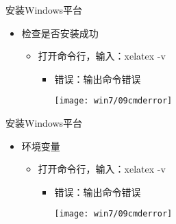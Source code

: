 \documentclass[fontset = none, t]{ctexbeamer}
\begin{document}
\begin{frame}{安装\tl}{Windows平台}
  \begin{spacing}{1.5}
    \begin{itemize}
    \item 检查\tl 是否安装成功
      \begin{itemize}
      \item 打开命令行，输入：xelatex -v
        \begin{itemize}
        \item 错误：输出\alert{命令错误}
          \begin{center}
            \texttt{[image: win7/09cmderror]}
          \end{center}
        \end{itemize}
      \end{itemize}
    \end{itemize}
  \end{spacing}         
\end{frame}

\begin{frame}{安装\tl}{Windows平台}
  \begin{spacing}{1.5}
    \begin{itemize}
    \item 环境变量
      \begin{itemize}
      \item 打开命令行，输入：xelatex -v
        \begin{itemize}
        \item 错误：输出\alert{命令错误}
          \begin{center}
            \texttt{[image: win7/09cmderror]}
          \end{center}
        \end{itemize}
      \end{itemize}
    \end{itemize}
  \end{spacing}         
\end{frame}
\end{document}
